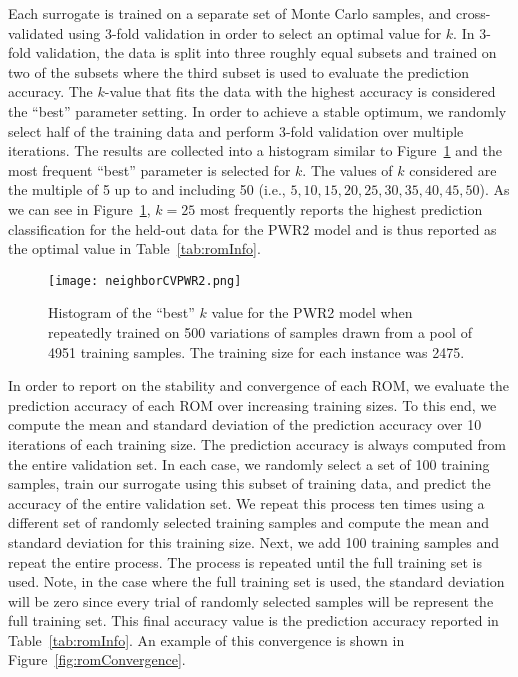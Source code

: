 Each surrogate is trained on a separate set of Monte Carlo samples, and cross-validated using 3-fold validation in order to select an optimal value for $k$.
%
In 3-fold validation, the data is split into three roughly equal subsets and trained on two of the subsets where the third subset is used to evaluate the prediction accuracy.
%
The $k$-value that fits the data with the highest accuracy is considered the ``best'' parameter setting.
%
In order to achieve a stable optimum, we randomly select half of the training data and perform 3-fold validation over multiple iterations.
%
The results are collected into a histogram similar to Figure~\ref{fig:neighborSelection} and the most frequent ``best'' parameter is selected for $k$.
%
The values of $k$ considered are the multiple of 5 up to and including 50 (i.e., $5,10,15,20,25,30,35,40,45,50$).
%
As we can see in Figure~\ref{fig:neighborSelection}, $k=25$ most frequently reports the highest prediction classification for the held-out data for the PWR2 model and is thus reported as the optimal value in Table~\ref{tab:romInfo}.

\begin{figure}[!htbp]
	\centering
	\texttt{[image: neighborCVPWR2.png]}
	\caption{Histogram of the ``best'' $k$ value for the PWR2 model when repeatedly trained on 500 variations of samples drawn from a pool of 4951 training samples. The training size for each instance was 2475.}
	\label{fig:neighborSelection}
\end{figure}

In order to report on the stability and convergence of each ROM, we evaluate the prediction accuracy of each ROM over increasing training sizes.
%
To this end, we compute the mean and standard deviation of the prediction accuracy over 10 iterations of each training size.
%
The prediction accuracy is always computed from the entire validation set.
%
In each case, we randomly select a set of 100 training samples, train our surrogate using this subset of training data, and predict the accuracy of the entire validation set.
%
We repeat this process ten times using a different set of randomly selected training samples and compute the mean and standard deviation for this training size.
%
Next, we add 100 training samples and repeat the entire process.
%
The process is repeated until the full training set is used.
%
Note, in the case where the full training set is used, the standard deviation will be zero since every trial of randomly selected samples will be represent the full training set.
%
This final accuracy value is the prediction accuracy reported in Table~\ref{tab:romInfo}.
%
An example of this convergence is shown in Figure~\ref{fig:romConvergence}.

